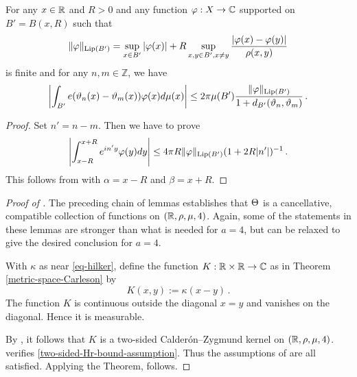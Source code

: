 \begin{lemma}
\label{real-van-der-Corput}
\leanok
{}
    For any $x\in {\mathbb{R}}$ and $R>0$ and any
    function $\varphi: X\to \mathbb{C}$ supported on $B'=B(x,R)$
    such that
\begin{equation}
    \|\varphi\|_{\operatorname{\operatorname{Lip}}(B')} = \sup_{x \in B'} |\varphi(x)| + R \sup_{x,y \in B', x \neq y} \frac{|\varphi(x) - \varphi(y)|}{\rho(x,y)}
\end{equation}
is finite and for any $n,m\in \mathbb{Z}$, we have
\begin{equation}
    \label{eq-vdc-cond1}
    \left|\int_{B'} e({\vartheta}_n(x)-{{\vartheta}_m(x)}) \varphi(x) d\mu(x)\right|\le 2\pi \mu(B')\frac{\|\varphi\|_{\operatorname{\operatorname{Lip}}(B')}}{1+d_{B'}({\vartheta}_n,{\vartheta}_m)}
\, .
\end{equation}
\end{lemma}
\begin{proof}
    \leanok
Set $n'=n-m$. Then we have to prove
\begin{equation}
    \label{eq-vdc-cond2}
    \left|\int_{x-R}^{x+R} e^{in'y}\varphi(y) dy\right|\le 4\pi R\|\varphi\|_{\operatorname{\operatorname{Lip}}(B')}
(1+2R|n'|)^{-1}\, .
\end{equation}
This follows from  with $\alpha = x - R$ and $\beta = x + R$.
\end{proof}

\begin{proof}[Proof of ]
\leanok

The preceding chain of lemmas establishes that ${\Theta}$ is a cancellative, compatible collection of functions on $({\mathbb{R}}, \rho, \mu, 4)$. Again, some of the statements in these lemmas are stronger than what is needed for $a=4$, but can be relaxed to give the desired conclusion for $a=4$.

With $\kappa$ as near \eqref{eq-hilker}, define
the function $K:{\mathbb{R}}\times {\mathbb{R}}\to \mathbb{C}$ as in Theorem
\ref{metric-space-Carleson} by
\begin{equation}
    K(x,y):=\kappa(x-y)\, .
\end{equation}
The function $K$ is continuous outside the diagonal
$x=y$ and vanishes on the diagonal. Hence it is measurable.


By , it follows that $K$ is a two-sided Calder\'on--Zygmund kernel on $({\mathbb{R}},\rho,\mu,4)$.
 verifies \eqref{two-sided-Hr-bound-assumption}.
Thus the assumptions of  are all satisfied. Applying the Theorem,  follows.

\end{proof}


\printbibliography